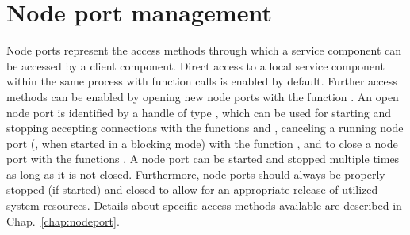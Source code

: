 \section{Node port management}
\label{sect:server_nodeport}

Node ports represent the access methods through which a service component can be accessed by a client component.
Direct access to a local service component within the same process with function calls is enabled by default.
Further access methods can be enabled by opening new node ports with the function .
An open node port is identified by a handle of type , which can be used for
starting and stopping accepting connections with the functions  and ,
canceling a running node port (\ie, when started in a blocking mode) with the function ,
and to close a node port with the functions .
A node port can be started and stopped multiple times as long as it is not closed.
Furthermore, node ports should always be properly stopped (if started) and closed to allow for an appropriate release of utilized system resources.
Details about specific access methods available are described in Chap.~\ref{chap:nodeport}.



